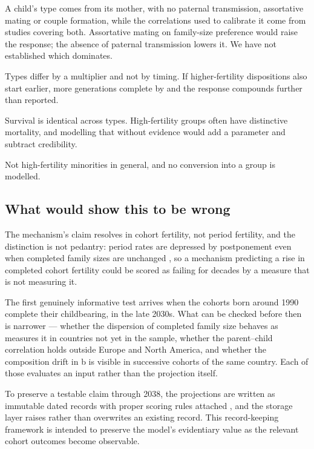 \begin{description}[leftmargin=1.4em,style=nextline]
\item[Transmission is maternal only.] A child's type comes from its mother, with
no paternal transmission, assortative mating or couple formation, while the
correlations used to calibrate it come from studies covering both. Assortative
mating on family-size preference would raise the response; the absence of
paternal transmission lowers it. We have not established which dominates.

\item[Every type shares one age profile of fertility.] Types differ by a
multiplier and not by timing. If higher-fertility dispositions also start
earlier, more generations complete by \ProjectionEndYear{} and the response
compounds further than reported.

\item[Selection is on fertility only.] Survival is identical across types.
High-fertility groups often have distinctive mortality, and modelling that
without evidence would add a parameter and subtract credibility.

\item[Named-group results cover two groups.] Not high-fertility minorities in
general, and no conversion into a group is modelled.

\end{description}

\subsection{What would show this to be wrong}
\label{sec:falsification}

The mechanism's claim resolves in cohort fertility, not period fertility, and the
distinction is not pedantry: period rates are depressed by postponement even when
completed family sizes are unchanged \citep{bongaarts1998}, so a mechanism
predicting a rise in completed cohort fertility could be scored as failing for
decades by a measure that is not measuring it.

The first genuinely informative test arrives when the cohorts born around 1990 complete their
childbearing, in the late 2030s. What can be checked before then is narrower ---
whether the dispersion of completed family size behaves as  measures
it in countries not yet in the sample, whether the parent--child correlation
holds outside Europe and North America, and whether the composition drift in
b is visible in successive cohorts of the same country. Each
of those evaluates an input rather than the projection itself.

To preserve a testable claim through 2038, the projections are written as
immutable dated records with proper scoring rules attached \citep{gneiting2007},
and the storage layer raises rather than overwrites an existing record. This
record-keeping framework is intended to preserve the model's evidentiary value as
the relevant cohort outcomes become observable.
